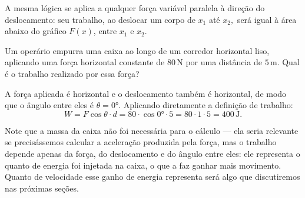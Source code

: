 A mesma lógica se aplica a qualquer força variável paralela à direção do deslocamento: seu trabalho, ao deslocar um corpo de $x_1$ até $x_2,$ será igual à área abaixo do gráfico $F(x)$, entre $x_1$ e $x_2.$
 




\vspace{0.3cm}

\begin{exemplo}[Nível I]\label{exemplo_energia_trabalhoex01}


Um operário empurra uma caixa ao longo de um corredor horizontal liso, aplicando
uma força horizontal constante de $80\,\text{N}$ por uma distância de $5\,\text{m}$.
Qual é o trabalho realizado por essa força?

\resolucao

A força aplicada é horizontal e o deslocamento também é horizontal, de modo que o
ângulo entre eles é $\theta = 0°$. Aplicando diretamente a definição de trabalho:
%
\begin{equation*}
    W = F\cos\theta \cdot d = 80 \cdot \cos 0° \cdot 5 = 80 \cdot 1 \cdot 5
    = \boxed{400\,\text{J}.}
\end{equation*}
 
Note que a massa da caixa não foi necessária para o cálculo --- ela seria relevante
se precisássemos calcular a aceleração produzida pela força, mas o trabalho depende
apenas da força, do deslocamento e do ângulo entre eles: ele representa o quanto de energia foi injetada na caixa, o que a faz ganhar mais movimento. Quanto de velocidade esse ganho de energia representa será algo que discutiremos nas próximas seções.

\end{exemplo}


\vspace{0.3cm}





